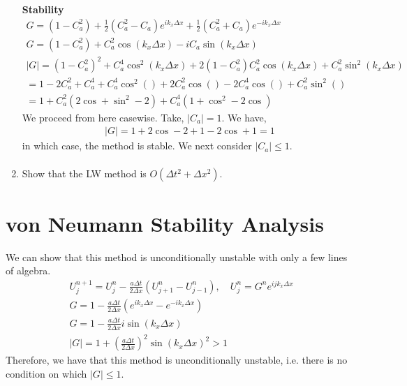 \documentclass{article}
\begin{document}
\begin{enumerate}[label = (\alph*)]
        \textbf{Stability} 
        \begin{gather*}
            G = (1 - C_a^2) + \frac{1}{2}\left(C_a^2 - C_a\right) e^{ik_x\Delta
            x} + \frac{1}{2}\left(C_a^2 + C_a\right) e^{-ik_x\Delta x}\\
            G = (1 - C_a^2) + C_a^2\cos(k_x \Delta x) - iC_a\sin(k_x \Delta x)\\
            |G| = (1 - C_a^2)^2 + C_a^4\cos^2(k_x \Delta x) + 2(1 -
            C_a^2)C_a^2\cos(k_x\Delta x) + C_a^2\sin^2(k_x\Delta x)\\
            = 1 - 2C_a^2 + C_a^4 + C_a^4\cos^2() + 2C_a^2\cos() - 2C_a^4\cos() +
            C_a^2\sin^2()\\
            = 1 + C_a^2\left(2\cos + \sin^2 - 2\right) + C_a^4\left(1 + \cos^2 -
            2\cos\right)
        \end{gather*}
        We proceed from here casewise. Take, $|C_a| = 1$. We have, 
        \begin{gather*}
            |G| = 1 + 2\cos - 2 + 1 - 2\cos + 1 = 1
        \end{gather*}
        in which case, the method is stable. 
        We next consider $|C_a| \le 1$.
        \begin{gather*}
            
        \end{gather*}

    

    \item Show that the LW method is $O(\Delta t^2 + \Delta x^2)$.
\end{enumerate}

\section{von Neumann Stability Analysis}
We can show that this method is unconditionally unstable with only a few lines
of algebra. 
\begin{gather*}
    U_j^{n+1} = U_j^n - \frac{a\Delta t}{2\Delta x}\left(U_{j+1}^n -
    U_{j-1}^n\right), \quad U_{j}^n = G^ne^{i j k_x \Delta x}\\
    G = 1 - \frac{a\Delta t}{2\Delta x}\left(e^{ik_x\Delta x}  - e^{-ik_x\Delta
    x}\right)\\
    G = 1 - \frac{a\Delta t}{2\Delta x}i\sin(k_x\Delta x)\\
    |G| = 1 + \left(\frac{a\Delta t}{2\Delta x}\right)^2\sin(k_x\Delta x)^2 > 1
\end{gather*}
Therefore, we have that this method is unconditionally unstable, i.e. there is
no condition on which $|G| \le 1$. 
\end{document}
